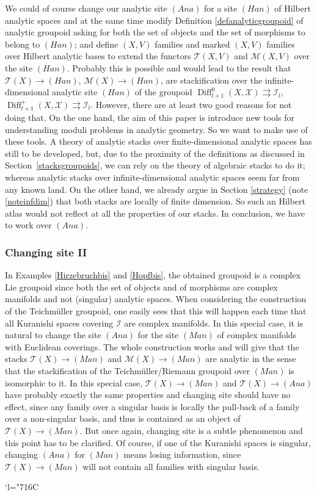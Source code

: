\documentclass[JEP,XML,SOM,Unicode]{cedram}
\let\mathcal\mathscr
\newcommand{\Changelback}{\mathcode`l="716C}
\newcommand{\Ana}{\mathit{Ana}}
\newcommand{\Han}{\mathit{Han}}
\newcommand{\Man}{\mathit{Man}}
\DeclareMathOperator{\Diff}{Diff}
\theoremstyle{plain}
\theoremstyle{definition}
\theoremstyle{remark}
\numberwithin{equation}{section}
\newcommand{\cI}{\mathcal{I}}
\begin{document}
We could of course change our analytic site $(\Ana)$ for a site $(\Han)$ of Hilbert analytic spaces and at the same time modify Definition \ref{defanalyticgroupoid} of analytic groupoid asking for both the set of objects and the set of morphisms to belong to $(\Han)$; and define $(X,V)$ families and marked $(X,V)$ families over Hilbert analytic bases to extend the functors $\mathcal T(X,V)$ and $\mathcal M(X,V)$ over the site $(\Han)$. Probably this is possible and would lead to the result that $\mathcal T(X)\to (\Han)$, \resp $\mathcal M(X)\to (\Han)$, are stackification over the infinite-dimensional analytic site $(\Han)$ of the groupoid $\Diff^0_{l+1} (X,\mathcal X)\rightrightarrows \cI_l$, \resp $\Diff^+_{l+1} (X,\mathcal X)\rightrightarrows \cI_l$. However, there are at least two good reasons for not doing that. On the one hand, the aim of this paper is introduce new tools for understanding moduli problems in analytic geometry. So we want to make use of these tools. A theory of analytic stacks over finite-dimensional analytic spaces has still to be developed, but, due to the proximity of the definitions as discussed in Section~\ref{stacksgroupoids}, we can rely on the theory of algebraic stacks to do it; whereas analytic stacks over infinite-dimensional analytic spaces seem far from any known land. On the other hand, we already argue in Section \ref{strategy} (\cf note \ref{noteinfdim}) that both stacks are locally of finite dimension. So such an Hilbert atlas would not reflect at all the properties of our stacks. In conclusion, we have to work over $(\Ana)$.

\subsubsection*{Changing site II} In Examples \ref{Hirzebruchbis} and \ref{Hopfbis}, the obtained groupoid is a complex Lie groupoid since both the set of objects and of morphisms are complex manifolds and not (singular) analytic spaces. When considering the construction of the Teichmüller groupoid, one easily sees that this will happen each time that all Kuranishi spaces covering $\cI$ are complex manifolds. In this special case, it is natural to change the site $(\Ana)$ for the site $(\Man)$ of complex manifolds with Euclidean coverings. The whole construction works and will give that the stacks $\mathcal T(X)\to (\Man)$ and $\mathcal M(X)\to (\Man)$ are analytic in the sense that the stackification of the Teichmüller/Riemann groupoid
over $(\Man)$ is isomorphic to it. In this special case, $\mathcal T(X)\to (\Man)$ and $\mathcal T(X)\to (\Ana)$ have probably exactly the same properties and changing site should have no effect, since any family over a singular basis is locally the pull-back of a family over a non-singular basis, and thus is contained as an object of $\mathcal T(X)\to (\Man)$. But once again, changing site is a subtle phenomenon and this point has to be clarified. Of course, if one of the Kuranishi spaces is singular, changing $(\Ana)$ for $(\Man)$ means losing information, since $\mathcal T(X)\to (\Man)$ will not contain all families with singular basis.

\Changelback



\end{document}
